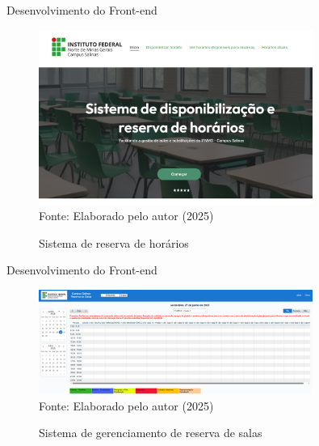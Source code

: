 \begin{frame}{Desenvolvimento do Front-end}
    \begin{figure}
        \centering
        \vspace{-0.5cm}
        \caption{Sistema de reserva de horários}
        \vspace{-0.2cm}
        \includegraphics[width=0.8\textwidth]{figuras/front-12.png}
        \\ %
        \small Fonte: Elaborado pelo autor (2025)
    \end{figure}
\end{frame}

\begin{frame}{Desenvolvimento do Front-end}
    \begin{figure}
        \centering
        \vspace{-0.5cm}
        \caption{Sistema de gerenciamento de reserva de salas}
        \vspace{-0.2cm}
        \includegraphics[width=0.8\textwidth]{figuras/front-13.png}
        \\ %
        \small Fonte: Elaborado pelo autor (2025)
    \end{figure}
\end{frame}

